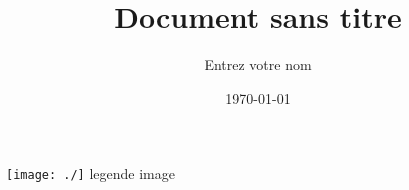 \documentclass[a4paper]{article}
\title{Document sans titre}
\author{Entrez votre nom}
\date{\today}
\begin{document}
\maketitle
\newpage
\texttt{[image: ./]}
legende image
~\\
\end{document}
